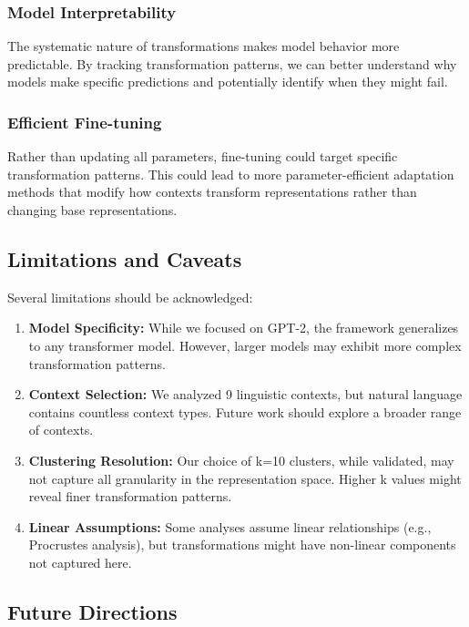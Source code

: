 \subsubsection{Model Interpretability}
The systematic nature of transformations makes model behavior more predictable. By tracking transformation patterns, we can better understand why models make specific predictions and potentially identify when they might fail.

\subsubsection{Efficient Fine-tuning}
Rather than updating all parameters, fine-tuning could target specific transformation patterns. This could lead to more parameter-efficient adaptation methods that modify how contexts transform representations rather than changing base representations.

\subsection{Limitations and Caveats}

Several limitations should be acknowledged:

\begin{enumerate}
\item \textbf{Model Specificity:} While we focused on GPT-2, the framework generalizes to any transformer model. However, larger models may exhibit more complex transformation patterns.

\item \textbf{Context Selection:} We analyzed 9 linguistic contexts, but natural language contains countless context types. Future work should explore a broader range of contexts.

\item \textbf{Clustering Resolution:} Our choice of k=10 clusters, while validated, may not capture all granularity in the representation space. Higher k values might reveal finer transformation patterns.

\item \textbf{Linear Assumptions:} Some analyses assume linear relationships (e.g., Procrustes analysis), but transformations might have non-linear components not captured here.
\end{enumerate}

\subsection{Future Directions}

